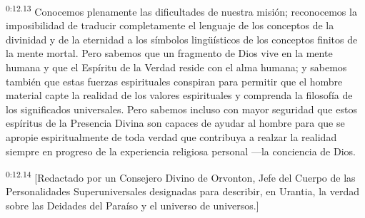 \par
\textsuperscript{0:12.13} Conocemos plenamente las dificultades de nuestra misión; reconocemos la imposibilidad de traducir completamente el lenguaje de los conceptos de la divinidad y de la eternidad a los símbolos ling\"uísticos de los conceptos finitos de la mente mortal. Pero sabemos que un fragmento de Dios vive en la mente humana y que el Espíritu de la Verdad reside con el alma humana; y sabemos también que estas fuerzas espirituales conspiran para permitir que el hombre material capte la realidad de los valores espirituales y comprenda la filosofía de los significados universales. Pero sabemos incluso con mayor seguridad que estos espíritus de la Presencia Divina son capaces de ayudar al hombre para que se apropie espiritualmente de toda verdad que contribuya a realzar la realidad siempre en progreso de la experiencia religiosa personal ---la conciencia de Dios.

\par
\textsuperscript{0:12.14} [Redactado por un Consejero Divino de Orvonton, Jefe del Cuerpo de las Personalidades Superuniversales designadas para describir, en Urantia, la verdad sobre las Deidades del Paraíso y el universo de universos.]